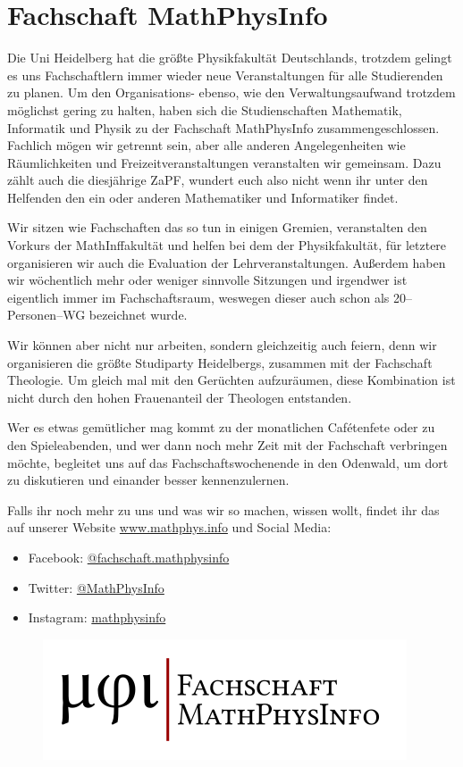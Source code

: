 
\section{Fachschaft MathPhysInfo}

Die Uni Heidelberg hat die größte Physikfakultät Deutschlands, trotzdem gelingt es uns Fachschaftlern immer wieder neue Veranstaltungen für alle Studierenden zu planen. Um den Organisations- ebenso, wie den Verwaltungsaufwand trotzdem möglichst gering zu halten, haben sich die Studienschaften Mathematik, Informatik und Physik zu der Fachschaft MathPhysInfo zusammengeschlossen. Fachlich mögen wir getrennt sein, aber alle anderen Angelegenheiten wie Räumlichkeiten und Freizeitveranstaltungen veranstalten wir gemeinsam. Dazu zählt auch die diesjährige ZaPF, wundert euch also nicht wenn ihr unter den Helfenden den ein oder anderen Mathematiker und Informatiker findet.

Wir sitzen wie Fachschaften das so tun in einigen Gremien, veranstalten den Vorkurs der MathInffakultät und helfen bei dem der Physikfakultät, für letztere organisieren wir auch die Evaluation der Lehrveranstaltungen. Außerdem haben wir wöchentlich mehr oder weniger sinnvolle Sitzungen und irgendwer ist eigentlich immer im Fachschaftsraum, weswegen dieser auch schon als 20--Personen--WG bezeichnet wurde.

Wir können aber nicht nur arbeiten, sondern gleichzeitig auch feiern, denn wir organisieren die größte Studiparty Heidelbergs, zusammen mit der Fachschaft Theologie. Um gleich mal mit den Gerüchten aufzuräumen, diese Kombination ist nicht durch den hohen Frauenanteil der Theologen entstanden.

Wer es etwas gemütlicher mag kommt zu der monatlichen Cafétenfete oder zu den Spieleabenden, und wer dann noch mehr Zeit mit der Fachschaft verbringen möchte, begleitet uns auf das Fachschaftswochenende in den Odenwald, um dort zu diskutieren und einander besser kennenzulernen.

Falls ihr noch mehr zu uns und was wir so machen, wissen wollt, findet ihr das auf unserer Website \url{www.mathphys.info} und Social Media: 
\begin{itemize}
\item[\faFacebookSquare] Facebook: \href{https://www.facebook.com/fachschaft.mathphysinfo}{@fachschaft.mathphysinfo}
\item[\faTwitterSquare] Twitter: \href{https://twitter.com/MathPhysInfo}{@MathPhysInfo}
\item[\faInstagram] Instagram: \href{https://www.instagram.com/mathphysinfo/}{mathphysinfo}
\end{itemize}


\begin{figure}[h]
\centering
\includegraphics[width=.5\textwidth]{media/mathphysinfologo}
\end{figure}